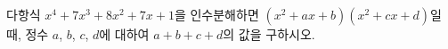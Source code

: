 다항식 $x^4+7x^3+8x^2+7x+1$을 인수분해하면 $(x^2+ax+b)(x^2+cx+d)$일 때, 정수 $a$, $b$, $c$, $d$에 대하여 $a+b+c+d$의 값을 구하시오.
